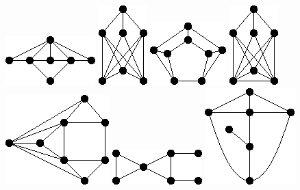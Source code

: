 \documentclass[11pt,paper=b5,footinclude,headinclude]{scrbook} %
\begin{document}
\includegraphics[scale=0.5,frame]{smallGraphs/g_X107.png}     
\includegraphics[scale=0.5,frame]{smallGraphs/g_X11.png}     
\includegraphics[scale=0.5,frame]{smallGraphs/g_X111.png}     
\includegraphics[scale=0.5,frame]{smallGraphs/g_X12.png}     
\includegraphics[scale=0.5,frame]{smallGraphs/g_X120.png}     
\includegraphics[scale=0.5,frame]{smallGraphs/g_X127.png}     
\includegraphics[scale=0.5,frame]{smallGraphs/g_X13.png}     
\end{document}
